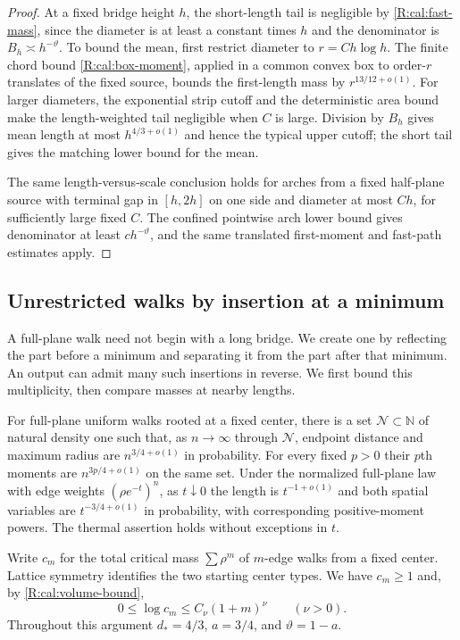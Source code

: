 \begin{proof}
At a fixed bridge height $h$, the short-length tail is negligible by
\eqref{R:cal:fast-mass}, since the diameter is at least a constant times
$h$ and the denominator is $B_h\asymp h^{-\vartheta}$. To bound the mean,
first restrict diameter to $r=Ch\log h$. The finite chord bound
\eqref{R:cal:box-moment}, applied in a common convex box to order-$r$
translates of the fixed source, bounds the first-length mass by
$r^{13/12+o(1)}$. For larger diameters, the exponential strip cutoff
and the deterministic area bound make the length-weighted tail
negligible when $C$ is large. Division by $B_h$ gives mean length at
most $h^{4/3+o(1)}$ and hence the typical upper cutoff; the short tail
gives the matching lower bound for the mean.

The same length-versus-scale conclusion holds for arches from a fixed
half-plane source with terminal gap in $[h,2h]$ on one side and diameter
at most $Ch$, for sufficiently large fixed $C$. The confined pointwise
arch lower bound gives denominator at least $ch^{-\vartheta}$, and the
same translated first-moment and fast-path estimates apply.
\end{proof}

\subsection{Unrestricted walks by insertion at a minimum}\label{R:cal:refolding}
A full-plane walk need not begin with a long bridge. We create one by
reflecting the part before a minimum and separating it from the part
after that minimum. An output can admit many such insertions in reverse.
We first bound this multiplicity, then compare masses at nearby lengths.

\begin{theorem}\label{R:cal:plane-laws}
For full-plane uniform walks rooted at a fixed center, there is a set
$\mathcal N\subset\mathbb N$ of natural density one such that, as
$n\to\infty$ through $\mathcal N$, endpoint distance and maximum radius
are $n^{3/4+o(1)}$ in probability. For every fixed $p>0$ their $p$th
moments are $n^{3p/4+o(1)}$ on the same set.
Under the normalized full-plane law with edge weights $(\rho e^{-t})^n$,
as $t\downarrow0$ the length is $t^{-1+o(1)}$ and both spatial variables
are $t^{-3/4+o(1)}$ in probability, with corresponding positive-moment
powers. The thermal assertion holds without exceptions in $t$.
\end{theorem}

Write $c_m$ for the total critical mass $\sum\rho^m$ of $m$-edge walks
from a fixed center. Lattice symmetry identifies the two starting center
types. We have $c_m\ge1$ and, by \eqref{R:cal:volume-bound},
\[
 0\le\log c_m\le C_\nu(1+m)^\nu\qquad(\nu>0).
\]
Throughout this argument $d_*=4/3$, $a=3/4$, and $\vartheta=1-a$.


